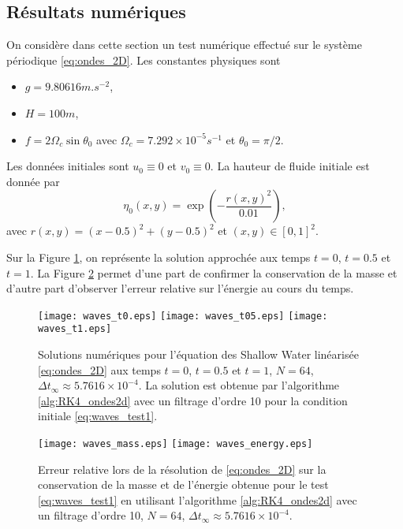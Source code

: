 \subsection{Résultats numériques}

On considère dans cette section un test numérique effectué sur le système périodique \eqref{eq:ondes_2D}. Les constantes physiques sont
\begin{itemize}
\item $g = 9.80616 \si{m.s^{-2}}$,
\item $H=100 \si{m}$,
\item $f = 2 \Omega_c \sin \theta_0$ avec $\Omega_c = 7.292 \times 10^{-5} \si{s^{-1}}$ et $\theta_0 = \pi/2$.
\end{itemize}
Les données initiales sont $u_0 \equiv 0$ et $v_0 \equiv 0$. La hauteur de fluide initiale est donnée par
\begin{equation}
\eta_0(x,y) = \exp \left( - \dfrac{r(x,y)^2}{0.01} \right),
\label{eq:waves_test1}
\end{equation}
avec $r(x,y) = (x-0.5)^2+(y-0.5)^2$ et $(x,y) \in [0,1]^2$.

Sur la Figure \ref{fig:waves_solution}, on représente la solution approchée aux temps $t=0$, $t=0.5$ et $t=1$. La Figure \ref{fig:waves_conservation} permet d'une part de confirmer la conservation de la masse et d'autre part d'observer l'erreur relative sur l'énergie au cours du temps.
\begin{figure}[htbp]
\begin{center}
\texttt{[image: waves\_t0.eps]}
\texttt{[image: waves\_t05.eps]}
\texttt{[image: waves\_t1.eps]}
\end{center}
\caption{Solutions numériques pour l'équation des Shallow Water linéarisée \eqref{eq:ondes_2D} aux temps $t=0$, $t=0.5$ et $t=1$, $N=64$, $\Delta t_{\infty} \approx 5.7616\times10^{-4}$. La solution est obtenue par l'algorithme \ref{alg:RK4_ondes2d} avec un filtrage d'ordre 10 pour la condition initiale \eqref{eq:waves_test1}.}
\label{fig:waves_solution}
\end{figure}
\begin{figure}[htbp]
\begin{center}
\texttt{[image: waves\_mass.eps]}
\texttt{[image: waves\_energy.eps]}
\end{center}
\caption{Erreur relative lors de la résolution de \eqref{eq:ondes_2D} sur la conservation de la masse et de l'énergie obtenue pour le test \eqref{eq:waves_test1} en utilisant l'algorithme \ref{alg:RK4_ondes2d} avec un filtrage d'ordre 10, $N=64$, $\Delta t_{\infty} \approx 5.7616\times10^{-4}$.}
\label{fig:waves_conservation}
\end{figure}

